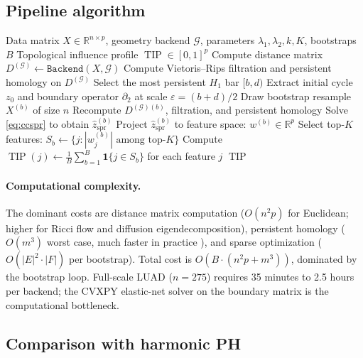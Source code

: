 \documentclass[12pt]{article}
\DeclareMathOperator{\TIP}{TIP}
\begin{document}
\subsection{Pipeline algorithm}
\label{sec:algorithm}

\begin{algorithm}[h]
\caption{CC-SPR Pipeline}
\label{alg:ccspr}
\begin{algorithmic}[1]
\REQUIRE Data matrix $X \in \mathbb{R}^{n \times p}$, geometry backend $\mathcal{G}$, parameters $\lambda_1, \lambda_2, k, K$, bootstraps $B$
\ENSURE Topological influence profile $\TIP \in [0,1]^p$
\STATE Compute distance matrix $D^{(\mathcal{G})} \gets \texttt{Backend}(X, \mathcal{G})$
\STATE Compute Vietoris--Rips filtration and persistent homology on $D^{(\mathcal{G})}$
\STATE Select the most persistent $H_1$ bar $[b, d)$
\STATE Extract initial cycle $z_0$ and boundary operator $\partial_2$ at scale $\varepsilon = (b + d)/2$
    \STATE Draw bootstrap resample $X^{(b)}$ of size $n$
    \STATE Recompute $D^{(\mathcal{G})(b)}$, filtration, and persistent homology
    \STATE Solve \eqref{eq:ccspr} to obtain $\hat{z}_{\mathrm{spr}}^{(b)}$
    \STATE Project $\hat{z}_{\mathrm{spr}}^{(b)}$ to feature space: $w^{(b)} \in \mathbb{R}^p$
    \STATE Select top-$K$ features: $S_b \gets \{j : |w^{(b)}_j| \text{ among top-}K\}$
\ENDFOR
\STATE Compute $\TIP(j) \gets \frac{1}{B} \sum_{b=1}^B \mathbf{1}\{j \in S_b\}$ for each feature $j$
\RETURN $\TIP$
\end{algorithmic}
\end{algorithm}

\paragraph{Computational complexity.}
The dominant costs are distance matrix computation ($O(n^2 p)$ for Euclidean; higher for Ricci flow and diffusion eigendecomposition), persistent homology ($O(m^3)$ worst case, much faster in practice \cite{gudhi2014}), and sparse optimization ($O(|E|^2 \cdot |F|)$ per bootstrap).
Total cost is $O(B \cdot (n^2 p + m^3))$, dominated by the bootstrap loop.
Full-scale LUAD ($n = 275$) requires 35 minutes to 2.5 hours per backend; the CVXPY elastic-net solver on the boundary matrix is the computational bottleneck.

\subsection{Comparison with harmonic PH}
\label{sec:comparison}
\end{document}
